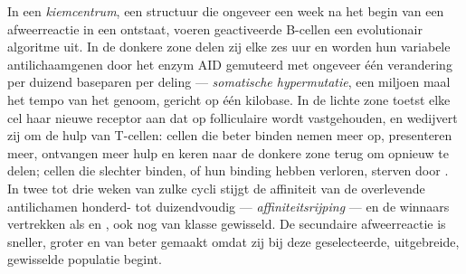 \begin{definition}\label{def:b3:adaptive-immunity:germinal-centre}
In een \emph{kiemcentrum}, een structuur die ongeveer een week na het
begin van een afweerreactie in een  ontstaat, voeren
geactiveerde B-cellen een evolutionair algoritme uit. In de donkere
zone delen zij elke zes uur en worden hun variabele antilichaamgenen
door het enzym AID gemuteerd met ongeveer één verandering per duizend
baseparen per deling --- \emph{somatische hypermutatie}, een miljoen
maal het tempo van het genoom, gericht op één kilobase. In de lichte
zone toetst elke cel haar nieuwe receptor aan  dat op
folliculaire  wordt vastgehouden, en wedijvert zij
om de hulp van T-cellen: cellen die beter binden nemen meer 
op, presenteren meer, ontvangen meer hulp en keren naar de donkere zone
terug om opnieuw te delen; cellen die slechter binden, of hun binding
hebben verloren, sterven door . In twee tot drie weken van
zulke cycli stijgt de affiniteit van de overlevende antilichamen
honderd- tot duizendvoudig --- \emph{affiniteitsrijping} --- en de
winnaars vertrekken als  en , ook nog van
klasse gewisseld. De secundaire afweerreactie is sneller, groter en van
beter  gemaakt omdat zij bij deze geselecteerde,
uitgebreide, gewisselde populatie begint.
\end{definition}

